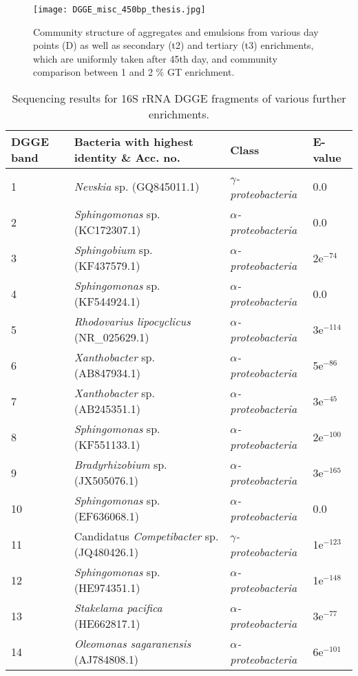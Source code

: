 \documentclass[11pt]{article}
\begin{document}
\begin{figure}
\texttt{[image: DGGE\_misc\_450bp\_thesis.jpg]}
\caption{Community structure of aggregates and emulsions from various day points (D) as well as secondary (t2) and tertiary (t3) enrichments, which are uniformly taken after 45th day, and community comparison between 1 and 2 \% GT enrichment.}
\end{figure}

\begin{table}
\caption{Sequencing results for 16S rRNA DGGE fragments of various further enrichments.}
\begin{tabular}{ | l | p{7.8cm} | p{3cm} | l | }
\hline
DGGE band & Bacteria with highest identity \& Acc. no. & Class & E-value \\
\hline
1 & \emph{Nevskia} sp. (GQ845011.1) & \emph{$\gamma$-proteobacteria} & 0.0  \\
\hline
2 & \emph{Sphingomonas} sp. (KC172307.1) & \emph{$\alpha$-proteobacteria} & 0.0 \\
\hline
3 & \emph{Sphingobium} sp. (KF437579.1) & \emph{$\alpha$-proteobacteria} & 2e$^{-74}$ \\
\hline
4 & \emph{Sphingomonas} sp. (KF544924.1) & \emph{$\alpha$-proteobacteria} & 0.0  \\
\hline
5 & \emph{Rhodovarius lipocyclicus} (NR\_025629.1) & \emph{$\alpha$-proteobacteria} & 3e$^{-114}$ \\
\hline
6 & \emph{Xanthobacter} sp. (AB847934.1) & \emph{$\alpha$-proteobacteria} & 5e$^{-86}$  \\
\hline
7 & \emph{Xanthobacter} sp. (AB245351.1) & \emph{$\alpha$-proteobacteria} & 3e$^{-45}$  \\
\hline
8 & \emph{Sphingomonas} sp.(KF551133.1) & \emph{$\alpha$-proteobacteria} & 2e$^{-100}$  \\
\hline
9 & \emph{Bradyrhizobium} sp. (JX505076.1) & \emph{$\alpha$-proteobacteria} & 3e$^{-165}$  \\
\hline
10 & \emph{Sphingomonas} sp. (EF636068.1) & \emph{$\alpha$-proteobacteria} & 0.0  \\
\hline
11 & Candidatus \emph{Competibacter} sp. (JQ480426.1) & \emph{$\gamma$-proteobacteria} & 1e$^{-123}$  \\
\hline
12 & \emph{Sphingomonas} sp. (HE974351.1) & \emph{$\alpha$-proteobacteria} &  1e$^{-148}$ \\
\hline
13 & \emph{Stakelama pacifica} (HE662817.1) & \emph{$\alpha$-proteobacteria} & 3e$^{-77}$  \\
\hline
14 & \emph{Oleomonas sagaranensis} (AJ784808.1) & \emph{$\alpha$-proteobacteria} & 6e$^{-101}$  \\
\hline
\end{tabular}

\end{table}
\FloatBarrier
\end{document}
